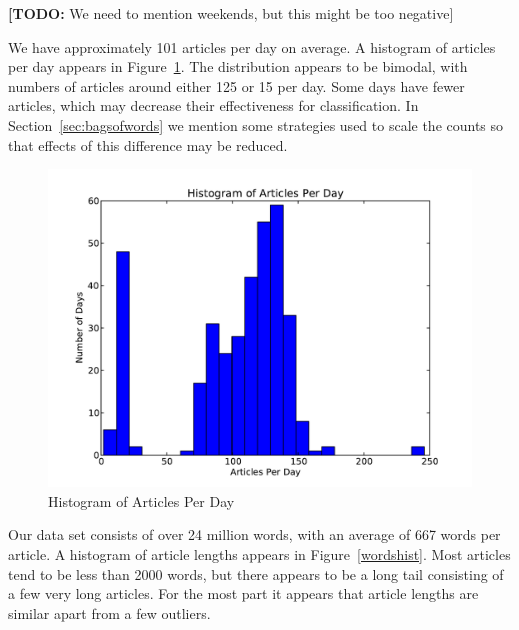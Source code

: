 \documentclass[10pt, twocolumn]{article}
\def\TODO#1{\noindent\textbf{[TODO:} #1]}
\begin{document}
\TODO{We need to mention weekends, but this might be too negative}

We have approximately 101 articles per day on average. A histogram of articles per day appears in Figure~\ref{articlehist}. The distribution appears to be bimodal, with numbers of articles around either 125 or 15 per day. Some days have fewer articles, which may decrease their effectiveness for classification. In Section~\ref{sec:bagsofwords} we mention some strategies used to scale the counts so that effects of this difference may be reduced.

\begin{figure}
\centering
\includegraphics[scale=0.3]{text/articleshist.pdf}
\caption{Histogram of Articles Per Day}

\label{articlehist}
\end{figure}

Our data set consists of over 24 million words, with an average of 667 words per article. A histogram of article lengths appears in Figure~\ref{wordshist}. Most articles tend to be less than 2000 words, but there appears to be a long tail consisting of a few very long articles. For the most part it appears that article lengths are similar apart from a few outliers.
\end{document}
